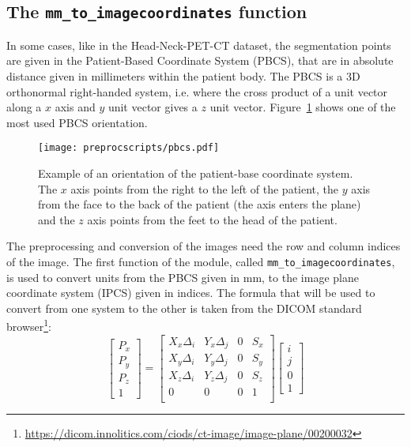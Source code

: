 \subsection{The \texttt{mm\_to\_imagecoordinates} function}
\label{sec:mmtocoord}
In some cases, like in the Head-Neck-PET-CT dataset, the segmentation points are given in the Patient-Based Coordinate System (PBCS), that are in absolute distance given in millimeters within the patient body. The PBCS is a 3D orthonormal right-handed system, i.e. where the cross product of a unit vector along a $x$ axis and $y$ unit vector gives a $z$ unit vector. Figure~\ref{fig:pbcs} shows one of the most used PBCS orientation.

\begin{figure}[t!]
  \centering
  \texttt{[image: preprocscripts/pbcs.pdf]}
  \caption[Patient-base coordinate system orientation example]{Example of an orientation of the patient-base coordinate system. The $x$ axis points from the right to the left of the patient, the $y$ axis from the face to the back of the patient (the axis enters the plane) and the $z$ axis points from the feet to the head of the patient.}
  \label{fig:pbcs}
\end{figure}

The preprocessing and conversion of the images need the row and column indices of the image. The first function of the module, called \texttt{mm\_to\_imagecoordinates}, is used to convert units from the PBCS given in mm, to the image plane coordinate system (IPCS) given in indices. The formula that will be used to convert from one system to the other is taken from the DICOM standard browser\footnote{\url{https://dicom.innolitics.com/ciods/ct-image/image-plane/00200032}}:
\begin{equation}
\label{eq:mmToIndicesMatrix}
  \begin{bmatrix}
    P_x \\ P_y \\ P_z \\ 1
  \end{bmatrix} =
  \begin{bmatrix}
    X_x \Delta_i & Y_x \Delta_j & 0 & S_x \\
    X_y \Delta_i & Y_y \Delta_j & 0 & S_y \\
    X_z \Delta_i & Y_z \Delta_j & 0 & S_z \\
    0 & 0 & 0 & 1 \\
  \end{bmatrix}
  \begin{bmatrix}
    i \\ j \\ 0 \\ 1
  \end{bmatrix}
\end{equation}

